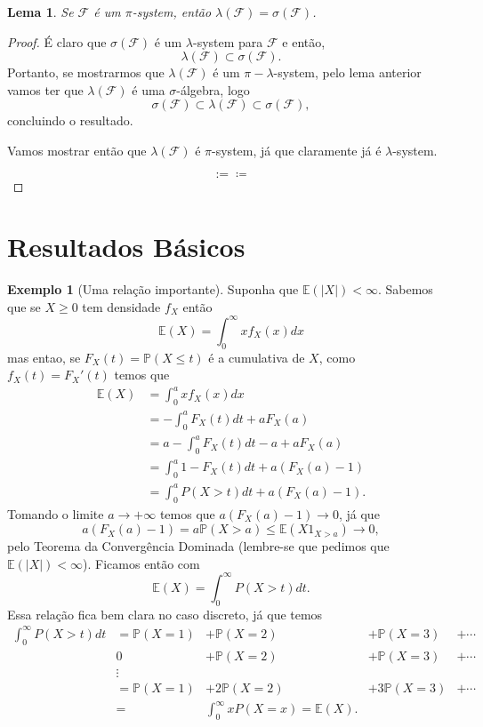 \documentclass[12pt,a4paper,oneside]{book}
\newtheorem{lemma}[theorem]{Lema}
\theoremstyle{definition}
\newtheorem{example}[theorem]{Exemplo}
\theoremstyle{remark}
\numberwithin{equation}{section}
\newcommand{\E}{\mathbb{E}}
\newcommand{\pr}{\mathbb{P}}
\newcommand{\F}{\mathcal{F}}
\begin{document}
\begin{lemma}
Se $\F$ é um $\pi$-system, então  $\lambda(\F) = \sigma(\F)$.
\end{lemma}
\begin{proof}
É claro que $\sigma(\F)$ é um $\lambda$-system para $\F$ e então,
$$\lambda(\F)\subset \sigma(\F). $$
Portanto, se mostrarmos que $\lambda(\F)$ é um $\pi-\lambda$-system, pelo lema anterior vamos ter que $\lambda(\F)$ é uma $\sigma$-álgebra, logo 
$$\sigma(\F)\subset \lambda(\F) \subset \sigma(\F), $$ concluindo o resultado.

Vamos mostrar então que $\lambda(\F)$ é $\pi$-system, já que claramente já é $\lambda$-system.


\[:= \coloneqq\]

\end{proof}



\newpage

\section{Resultados Básicos}








\begin{example}[Uma relação importante] Suponha que $\E(|X|)<\infty.$ Sabemos que se $X\geq 0 $ tem densidade $f_X$ então
$$\E(X) = \int_0^\infty xf_X(x)dx $$
mas entao, se $F_X(t) = \pr(X\leq t)$ é a cumulativa de  $X$, como $f_X(t) = F_X'(t)$ temos que
\begin{align*}
\E(X) &= \int_0^a xf_X(x)dx\\
 	&= -\int_0^a F_X(t)dt +  aF_X(a) \\
 	&= a-\int_0^a F_X(t)dt -a +  aF_X(a)\\
 	&= \int_0^a1- F_X(t)dt +  a(F_X(a)-1)\\
  	&= \int_0^a P(X>t)dt +  a(F_X(a)-1).
\end{align*}
Tomando o limite $a\rightarrow +\infty$ temos que  $a(F_X(a)-1) \rightarrow 0$, já que
$$ a(F_X(a)-1) = a\pr(X>a)\leq \E(X1_{X>a})\rightarrow 0,$$
pelo Teorema da Convergência Dominada (lembre-se que pedimos que $\E(|X|)<\infty$). 
Ficamos então com 
$$\E(X) =\int_0^\infty P(X>t)dt. $$
Essa relação fica bem clara no caso discreto, já que temos
$$ 
\begin{array}{cccccccccccccccccccc}
\int_0^\infty P(X>t)dt &= \pr(X=1) &+ \pr(X=2) &+\pr(X=3) &+ \cdots\\
      &0   &+ \pr(X=2) &+\pr(X=3) &+ \cdots\\
      &\vdots&\\
      &= \pr(X=1) &+ 2\pr(X=2) &+ 3\pr(X=3) &+ \cdots\\
      &=& \int_0^\infty xP(X=x) = \E(X).

\end{array}
$$

\end{example}
\end{document}
